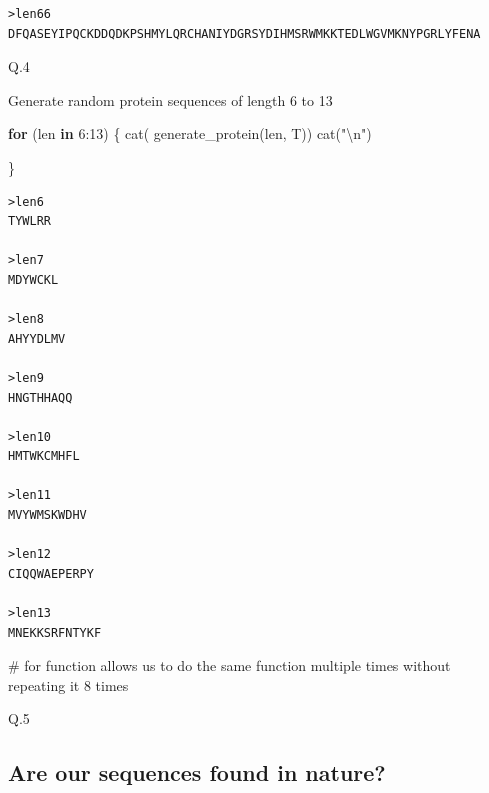 \documentclass[
  letterpaper,
  DIV=11,
  numbers=noendperiod]{scrartcl}
\newenvironment{Shaded}{\begin{snugshade}}{\end{snugshade}}
\newcommand{\CommentTok}[1]{\textcolor[rgb]{0.37,0.37,0.37}{#1}}
\newcommand{\ControlFlowTok}[1]{\textcolor[rgb]{0.00,0.23,0.31}{\textbf{#1}}}
\newcommand{\DecValTok}[1]{\textcolor[rgb]{0.68,0.00,0.00}{#1}}
\newcommand{\FunctionTok}[1]{\textcolor[rgb]{0.28,0.35,0.67}{#1}}
\newcommand{\NormalTok}[1]{\textcolor[rgb]{0.00,0.23,0.31}{#1}}
\newcommand{\SpecialCharTok}[1]{\textcolor[rgb]{0.37,0.37,0.37}{#1}}
\newcommand{\StringTok}[1]{\textcolor[rgb]{0.13,0.47,0.30}{#1}}
\begin{document}
\begin{verbatim}
>len66
DFQASEYIPQCKDDQDKPSHMYLQRCHANIYDGRSYDIHMSRWMKKTEDLWGVMKNYPGRLYFENA
\end{verbatim}

Q.4

Generate random protein sequences of length 6 to 13

\begin{Shaded}
\begin{Highlighting}[]
\ControlFlowTok{for}\NormalTok{ (len }\ControlFlowTok{in} \DecValTok{6}\SpecialCharTok{:}\DecValTok{13}\NormalTok{) \{}
 \FunctionTok{cat}\NormalTok{( }\FunctionTok{generate\_protein}\NormalTok{(len, T))}
  \FunctionTok{cat}\NormalTok{(}\StringTok{"}\SpecialCharTok{\textbackslash{}n}\StringTok{"}\NormalTok{)}
  
\NormalTok{\}}
\end{Highlighting}
\end{Shaded}

\begin{verbatim}
>len6
TYWLRR

>len7
MDYWCKL

>len8
AHYYDLMV

>len9
HNGTHHAQQ

>len10
HMTWKCMHFL

>len11
MVYWMSKWDHV

>len12
CIQQWAEPERPY

>len13
MNEKKSRFNTYKF
\end{verbatim}

\begin{Shaded}
\begin{Highlighting}[]
\CommentTok{\# for function allows us to do the same function multiple times without repeating it 8 times}
\end{Highlighting}
\end{Shaded}

Q.5

\subsection{Are our sequences found in
nature?}\label{are-our-sequences-found-in-nature}
\end{document}
